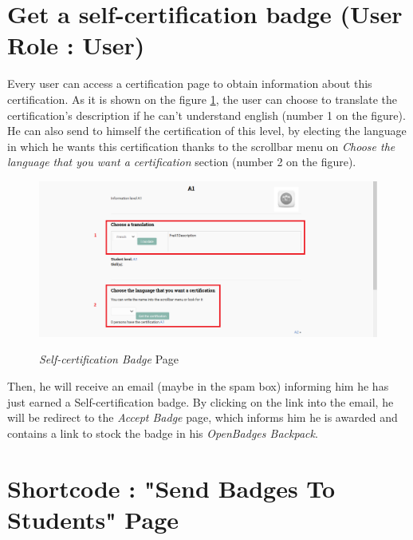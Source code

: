 \documentclass[a4paper, 12pt]{report}
\begin{document}
		
		
		
		
	\newpage
	
		\section{Get a self-certification badge (User Role : User)}
	
	Every user can access a certification page to obtain information about this certification. As it is shown on the figure \ref{selfCertificationPage}, the user can choose to translate the certification's description if he can't understand english (number 1 on the figure). He can also send to himself the certification of this level, by electing the language in which he wants this certification thanks to the scrollbar menu on \textit{Choose the language that you want a certification} section (number 2 on the figure).
	
	\begin{figure}[h]
		\caption{\textit{Self-certification Badge} Page}
		\includegraphics[scale=0.45]{includes/selfCertificationPage}
		\label{selfCertificationPage}
	\end{figure}


	Then, he will receive an email (maybe in the spam box) informing him he has just earned a Self-certification badge. By clicking on the link into the email, he will be redirect to the \textit{Accept Badge} page, which informs him he is awarded and contains a link to stock the badge in his \textit{OpenBadges Backpack}.






	\newpage
	
		\section{Shortcode : "Send Badges To Students" Page}
		
\end{document}
